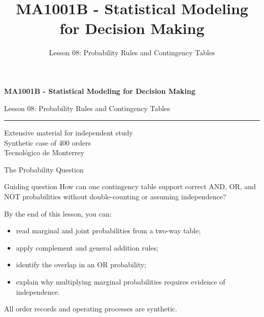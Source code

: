 \documentclass[aspectratio=169,10pt,english]{beamer}
\title{MA1001B - Statistical Modeling for Decision Making}
\subtitle{Lesson 08: Probability Rules and Contingency Tables}
\author{}
\institute{Tecnol\'ogico de Monterrey}
\date{}
\begin{document}
\begin{frame}[plain]
  \vspace{1.2cm}
  {\Large\bfseries MA1001B - Statistical Modeling for Decision Making\par}
  \vspace{0.7cm}
  {\large Lesson 08: Probability Rules and Contingency Tables\par}
  \vspace{0.7cm}
  {\color{TecRojo}\rule{\textwidth}{1.2pt}}
  \vspace{0.8cm}

  Extensive material for independent study\\[0.3cm]
  Synthetic case of 400 orders\\[0.3cm]
  Tecnol\'ogico de Monterrey
\end{frame}

\begin{frame}{The Probability Question}
  \begin{alertblock}{Guiding question}
    How can one contingency table support correct AND, OR, and NOT
    probabilities without double-counting or assuming independence?
  \end{alertblock}

  \vspace{0.4em}
  By the end of this lesson, you can:
  \begin{itemize}
    \item read marginal and joint probabilities from a two-way table;
    \item apply complement and general addition rules;
    \item identify the overlap in an OR probability;
    \item explain why multiplying marginal probabilities requires evidence of
      independence.
  \end{itemize}

  \vfill
  \scriptsize All order records and operating processes are synthetic.
\end{frame}
\end{document}
